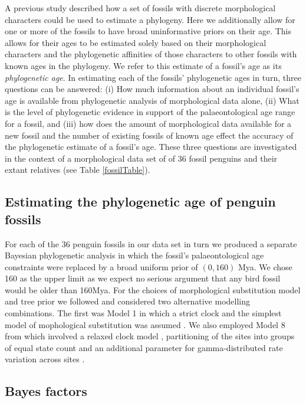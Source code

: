 \documentclass[11pt]{article}
\begin{document}
A previous study described how a set of fossils with discrete morphological characters could be used to estimate a phylogeny. Here we additionally allow for one or more of the fossils to have broad uninformative priors on their age. This allows for their ages to be estimated solely based on their morphological characters and the phylogenetic affinities of those characters to other fossils with known ages in the phylogeny. We refer to this estimate of a fossil's age as its {\em phylogenetic age}. In estimating each of the fossils' phylogenetic ages in turn, three questions can be answered: (i) How much information about an individual fossil's age is available from phylogenetic analysis of morphological data alone, (ii) What is the level of phylogenetic evidence in support of the palaeontological age range for a fossil, and (iii) how does the amount of morphological data available for a new fossil and the number of existing fossils of known age effect the accuracy of the phylogenetic estimate of a fossil's age. These three questions are investigated in the context of a morphological data set of of 36 fossil penguins and their extant relatives \autocite{gavryushkina2015bayesian} (see Table \ref{fossilTable}).

\subsection*{Estimating the phylogenetic age of penguin fossils}

For each of the 36 penguin fossils in our data set in turn we produced a separate Bayesian phylogenetic analysis in which the fossil's palaeontological age constraints were replaced by a broad uniform prior of $(0,160)$ Mya. We chose 160 as the upper limit as we expect no serious argument that any bird fossil would be older than 160Mya. For the choices of morphological substitution model and tree prior we followed \textcite{gavryushkina2015bayesian} and considered two alternative modelling combinations. The first was Model 1 in which a strict clock and the simplest model of mophological substitution was assumed \autocite{Lewis2001}. We also employed Model 8 from \textcite{gavryushkina2015bayesian} which involved a relaxed clock model \autocite{Drummond2006}, partitioning of the sites into groups of equal state count and an additional parameter for gamma-distributed rate variation across sites \autocite{yang:1994ma}.



\subsection*{Bayes factors}
\end{document}
